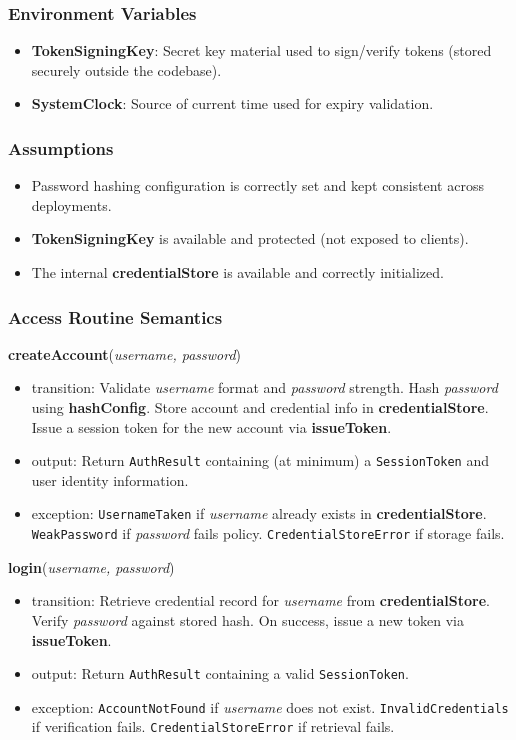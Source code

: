 \documentclass[12pt, titlepage]{article}
\begin{document}
\subsubsection{Environment Variables}
\begin{itemize}
    \item \textbf{TokenSigningKey}: Secret key material used to sign/verify tokens (stored securely outside the codebase).
    \item \textbf{SystemClock}: Source of current time used for expiry validation.
\end{itemize}

\subsubsection{Assumptions}
\begin{itemize}
    \item Password hashing configuration is correctly set and kept consistent across deployments.
    \item \textbf{TokenSigningKey} is available and protected (not exposed to clients).
    \item The internal \textbf{credentialStore} is available and correctly initialized.
\end{itemize}

\subsubsection{Access Routine Semantics}

\noindent\textbf{createAccount}(\textit{username, password})
\begin{itemize}
    \item transition: Validate \textit{username} format and \textit{password} strength. Hash \textit{password} using \textbf{hashConfig}. Store account and credential info in \textbf{credentialStore}. Issue a session token for the new account via \textbf{issueToken}.
    \item output: Return \texttt{AuthResult} containing (at minimum) a \texttt{SessionToken} and user identity information.
    \item exception: \texttt{UsernameTaken} if \textit{username} already exists in \textbf{credentialStore}. \texttt{WeakPassword} if \textit{password} fails policy. \texttt{CredentialStoreError} if storage fails.
\end{itemize}

\noindent\textbf{login}(\textit{username, password})
\begin{itemize}
    \item transition: Retrieve credential record for \textit{username} from \textbf{credentialStore}. Verify \textit{password} against stored hash. On success, issue a new token via \textbf{issueToken}.
    \item output: Return \texttt{AuthResult} containing a valid \texttt{SessionToken}.
    \item exception: \texttt{AccountNotFound} if \textit{username} does not exist. \texttt{InvalidCredentials} if verification fails. \texttt{CredentialStoreError} if retrieval fails.
\end{itemize}
\end{document}
